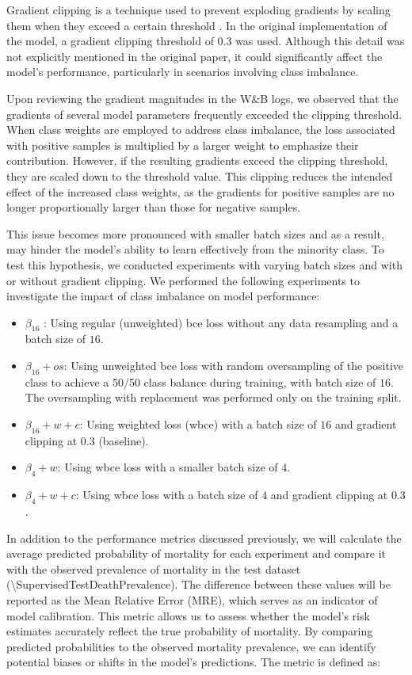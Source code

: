 Gradient clipping is a technique used to prevent exploding gradients by scaling them when they exceed a certain threshold \cite[][409]{Goodfellow-et-al-2016}. In the original implementation of the model, a gradient clipping threshold of \num{0.3} was used. Although this detail was not explicitly mentioned in the original paper, it could significantly affect the model's performance, particularly in scenarios involving class imbalance.



Upon reviewing the gradient magnitudes in the W\&B logs, we observed that the gradients of several model parameters frequently exceeded the clipping threshold. When class weights are employed to address class imbalance, the loss associated with positive samples is multiplied by a larger weight to emphasize their contribution. However, if the resulting gradients exceed the clipping threshold, they are scaled down to the threshold value. This clipping reduces the intended effect of the increased class weights, as the gradients for positive samples are no longer proportionally larger than those for negative samples.

This issue becomes more pronounced with smaller batch sizes and as a result, may hinder the model's ability to learn effectively from the minority class. To test this hypothesis, we conducted experiments with varying batch sizes and with or without gradient clipping. We performed the following experiments to investigate the impact of class imbalance on model performance:

\begin{itemize}
    \item $\beta_{16}$ : Using regular (unweighted) \gls{bce} loss without any data resampling and a batch size of \( 16 \).
    \item $\beta_{16} + os$: Using unweighted \gls{bce} loss with random oversampling of the positive class to achieve a 50/50 class balance during training, with batch size of \( 16 \). The oversampling with replacement was performed only on the training split.
    \item $\beta_{16} + w + c$: Using weighted loss (\gls{wbce}) with a batch size of \( 16 \) and gradient clipping at  \( 0.3 \) (baseline).
    \item $\beta_{4} + w$: Using \gls{wbce} loss with a smaller batch size of \( 4 \).
    \item $\beta_{4} + w + c$: Using \gls{wbce} loss with a batch size of \( 4 \) and gradient clipping at \( 0.3 \).
\end{itemize}
In addition to the performance metrics discussed previously, we will calculate the average predicted probability of mortality for each experiment and compare it with the observed prevalence of mortality in the test dataset (\num{\SupervisedTestDeathPrevalence}). The difference between these values will be reported as the Mean Relative Error (MRE), which serves as an indicator of model calibration. This metric allows us to assess whether the model's risk estimates accurately reflect the true probability of mortality. By comparing predicted probabilities to the observed mortality prevalence, we can identify potential biases or shifts in the model's predictions. The metric is defined as:

